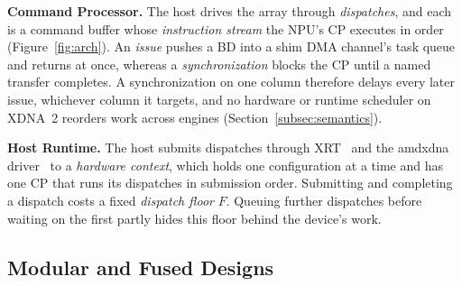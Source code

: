 \textbf{Command Processor.}
The host drives the array through \emph{dispatches}, and each is a command buffer whose \emph{instruction stream} the NPU's CP executes in order (Figure~\ref{fig:arch}).
An \emph{issue} pushes a BD into a shim DMA channel's task queue and returns at once, whereas a \emph{synchronization} blocks the CP until a named transfer completes.
A synchronization on one column therefore delays every later issue, whichever column it targets, and no hardware or runtime scheduler on XDNA~2 reorders work across engines (Section~\ref{subsec:semantics}).

\textbf{Host Runtime.}
The host submits dispatches through XRT~\citep{xrt-repo} and the amdxdna driver~\citep{xdna-driver} to a \emph{hardware context}, which holds one configuration at a time and has one CP that runs its dispatches in submission order.
Submitting and completing a dispatch costs a fixed \emph{dispatch floor} $F$.
Queuing further dispatches before waiting on the first partly hides this floor behind the device's work.

\subsection{Modular and Fused Designs}
\label{subsec:spectrum}

